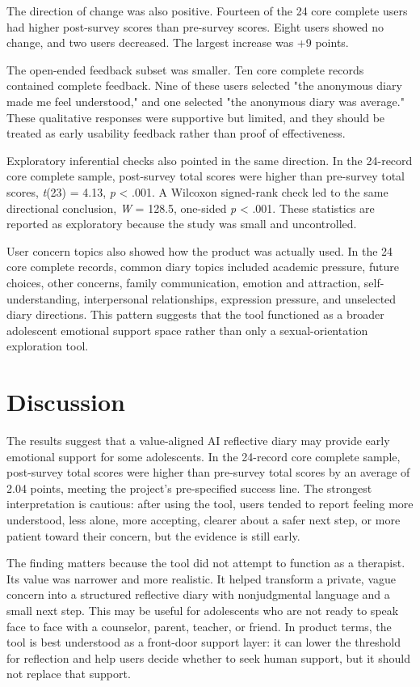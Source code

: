 The direction of change was also positive. Fourteen of the 24 core complete users had higher post-survey scores than pre-survey scores. Eight users showed no change, and two users decreased. The largest increase was +9 points.

The open-ended feedback subset was smaller. Ten core complete records contained complete feedback. Nine of these users selected "the anonymous diary made me feel understood," and one selected "the anonymous diary was average." These qualitative responses were supportive but limited, and they should be treated as early usability feedback rather than proof of effectiveness.

Exploratory inferential checks also pointed in the same direction. In the 24-record core complete sample, post-survey total scores were higher than pre-survey total scores, \textit{t}(23) = 4.13, \textit{p} < .001. A Wilcoxon signed-rank check led to the same directional conclusion, \textit{W} = 128.5, one-sided \textit{p} < .001. These statistics are reported as exploratory because the study was small and uncontrolled.

User concern topics also showed how the product was actually used. In the 24 core complete records, common diary topics included academic pressure, future choices, other concerns, family communication, emotion and attraction, self-understanding, interpersonal relationships, expression pressure, and unselected diary directions. This pattern suggests that the tool functioned as a broader adolescent emotional support space rather than only a sexual-orientation exploration tool.

\section{Discussion}

The results suggest that a value-aligned AI reflective diary may provide early emotional support for some adolescents. In the 24-record core complete sample, post-survey total scores were higher than pre-survey total scores by an average of 2.04 points, meeting the project's pre-specified success line. The strongest interpretation is cautious: after using the tool, users tended to report feeling more understood, less alone, more accepting, clearer about a safer next step, or more patient toward their concern, but the evidence is still early.

The finding matters because the tool did not attempt to function as a therapist. Its value was narrower and more realistic. It helped transform a private, vague concern into a structured reflective diary with nonjudgmental language and a small next step. This may be useful for adolescents who are not ready to speak face to face with a counselor, parent, teacher, or friend. In product terms, the tool is best understood as a front-door support layer: it can lower the threshold for reflection and help users decide whether to seek human support, but it should not replace that support.

